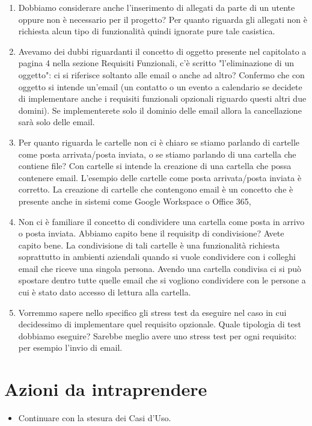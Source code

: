 \documentclass[12pt]{article}
\begin{document}
    \begin{enumerate}[label=\textbf{Q\arabic*:}]
        \item Dobbiamo considerare anche l'inserimento di allegati da parte di un utente oppure non è necessario per il progetto?
        \answer Per quanto riguarda gli allegati non è richiesta alcun tipo di funzionalità quindi ignorate pure tale casistica.

        \item Avevamo dei dubbi riguardanti il concetto di oggetto presente nel capitolato a pagina 4 nella sezione Requisiti Funzionali, c'è scritto "l’eliminazione di un oggetto": ci si riferisce soltanto alle email o anche ad altro?
        \answer Confermo che con oggetto si intende un'email (un contatto o un evento a calendario se decidete di implementare anche i requisiti funzionali opzionali riguardo questi altri due domini). Se implementerete solo il dominio delle email  allora la cancellazione sarà solo delle email.

        \item Per quanto riguarda le cartelle non ci è chiaro se stiamo parlando di cartelle come posta arrivata/posta inviata, o se stiamo parlando di una cartella che contiene file?
        \answer Con cartelle si intende la creazione di una cartella che possa contenere email. L'esempio delle cartelle come posta arrivata/posta inviata è corretto. La creazione di cartelle che contengono email è un concetto che è presente anche in sistemi come Google Workspace o Office 365,

        \item Non ci è familiare il concetto di condividere una cartella come posta in arrivo o posta inviata. Abbiamo capito bene il requisitp di condivisione?
        \answer Avete capito bene. La condivisione di tali cartelle è una funzionalità richiesta soprattutto in ambienti aziendali quando si vuole condividere con i colleghi email che riceve una singola persona.  Avendo una cartella condivisa ci si può spostare dentro tutte quelle email che si vogliono condividere con le persone a cui è stato dato accesso di lettura alla cartella.

        \item Vorremmo sapere nello specifico gli stress test da eseguire nel caso in cui decidessimo di implementare quel requisito opzionale. Quale tipologia di test dobbiamo eseguire? 
        \answer Sarebbe meglio avere uno stress test per ogni requisito: per esempio l'invio di email.
    \end{enumerate}
    
    \section{Azioni da intraprendere}
        \begin{itemize}
            \item Continuare con la stesura dei Casi d'Uso.
    	\end{itemize}
\end{document}
